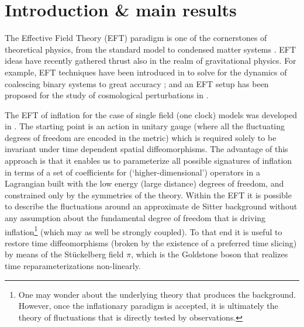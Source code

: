 \documentclass[11pt,amsmath,floats,floatfix,nofootinbib,secnumarabic, superscriptaddress, tightenlines]{revtex4}
\begin{document}
\maketitle
\newpage
\tableofcontents

\section{Introduction \& main results}\label{warm}

The Effective Field Theory (EFT) paradigm is one of the cornerstones of theoretical physics, from the standard model to condensed matter systems \cite{iraeft,joeeft}. EFT ideas have recently gathered thrust also in the realm of gravitational physics. For example, EFT techniques have been introduced in \cite{nrgr1,nrgr1p,radgo} to solve for the dynamics of coalescing binary systems to great accuracy \cite{nrgr2,nrgr2p,nrgr2p2,andi,foffa,eftrev};  and an EFT setup has been proposed for the study of cosmological perturbations in \cite{eftfluid}.

The EFT of inflation for the case of single field (one clock) models was developed in \cite{eft1, Cheung:2007sv, Senatore:2009gt, Senatore:2009cf, Senatore:2010jy, Creminelli:2006xe, Bartolo:2010bj, Bartolo:2010di,dan2,strongc,dan2new}. The starting point is an action in unitary gauge (where all the fluctuating degrees of freedom are encoded in the metric) which is required solely to be invariant under time dependent spatial diffeomorphisms. The advantage of this approach is that it enables us to parameterize all possible signatures of inflation in terms of a set of coefficients for (`higher-dimensional') operators in a Lagrangian built with the low energy (large distance) degrees of freedom, and constrained only by the symmetries of the theory. Within the EFT it is possible to describe the fluctuations around an approximate de Sitter background without any assumption about the fundamental degree of freedom that is driving inflation\footnote{One may wonder about the underlying theory that produces the background. However, once the inflationary paradigm is accepted, it is ultimately the theory of fluctuations that is directly tested by observations.} (which may as well be strongly coupled).
To that end it is useful to restore time diffeomorphisms (broken by the existence of a preferred time slicing) by means of the St\"uckelberg field $\pi$, which is the Goldstone boson that realizes time reparameterizations non-linearly. 
\end{document}
